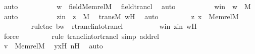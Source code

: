 \begin{isabellebody}
\ auto\ \isanewline
\ \ \ \ \ \ \isamarkupfalse%
\ \isamarkupfalse%
\ {\isachardoublequoteopen}w\ {\isasymin}\ field{\isacharparenleft}{\kern0pt}Memrel{\isacharparenleft}{\kern0pt}M{\isacharparenright}{\kern0pt}{\isacharparenright}{\kern0pt}{\isachardoublequoteclose}\ \isamarkupfalse%
\ field{\isacharunderscore}{\kern0pt}trancl\ \isamarkupfalse%
\ auto\ \isanewline
\ \ \ \ \ \ \isamarkupfalse%
\ \isamarkupfalse%
\ win\ {\isacharcolon}{\kern0pt}\ {\isachardoublequoteopen}w\ {\isasymin}\ M{\isachardoublequoteclose}\ \isamarkupfalse%
\ auto\ \isanewline
\ \ \ \ \ \ \isamarkupfalse%
\ \isamarkupfalse%
\ zin\ {\isacharcolon}{\kern0pt}\ {\isachardoublequoteopen}z\ {\isasymin}\ M{\isachardoublequoteclose}\ \isamarkupfalse%
\ transM\ wH\ \isamarkupfalse%
\ auto\ \isanewline
\ \ \ \ \ \ \isamarkupfalse%
\ {\isachardoublequoteopen}{\isacharless}{\kern0pt}z{\isacharcomma}{\kern0pt}\ x{\isachargreater}{\kern0pt}\ {\isasymin}\ Memrel{\isacharparenleft}{\kern0pt}M{\isacharparenright}{\kern0pt}{\isacharcircum}{\kern0pt}{\isacharplus}{\kern0pt}{\isachardoublequoteclose}\ \isanewline
\ \ \ \ \ \ \ \ \isamarkupfalse%
{\isacharparenleft}{\kern0pt}rule{\isacharunderscore}{\kern0pt}tac\ b{\isacharequal}{\kern0pt}w\ \ rtrancl{\isacharunderscore}{\kern0pt}into{\isacharunderscore}{\kern0pt}trancl{}{\isacharparenright}{\kern0pt}\isanewline
\ \ \ \ \ \ \ \ \isamarkupfalse%
\ win\ zin\ wH\ \isanewline
\ \ \ \ \ \ \ \ \ \isamarkupfalse%
\ force\isanewline
\ \ \ \ \ \ \ \ \isamarkupfalse%
{\isacharparenleft}{\kern0pt}rule\ trancl{\isacharunderscore}{\kern0pt}into{\isacharunderscore}{\kern0pt}rtrancl{\isacharcomma}{\kern0pt}\ simp\ add{\isacharcolon}{\kern0pt}rel{\isacharparenright}{\kern0pt}\isanewline
\ \ \ \ \ \ \ \ \isamarkupfalse%
\isanewline
\ \ \ \ \isamarkupfalse%
\isanewline
\ \ \isamarkupfalse%
\isanewline
\isanewline
\ \ \isamarkupfalse%
\ \isamarkupfalse%
\ {\isachardoublequoteopen}v\ {\isasymin}\ Memrel{\isacharparenleft}{\kern0pt}M{\isacharparenright}{\kern0pt}{\isacharcircum}{\kern0pt}{\isacharplus}{\kern0pt}{\isachardoublequoteclose}\ \isamarkupfalse%
\ yxH\ nH\ \isamarkupfalse%
\ auto\isanewline
{}\isamarkupfalse%
\ \isanewline
\ \ \isamarkupfalse%

\end{isabellebody}
